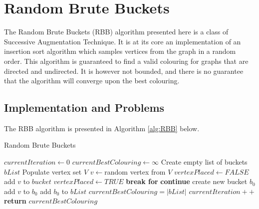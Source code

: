 \section{Random Brute Buckets}
The Random Brute Buckets (RBB) algorithm presented here is a class of Successive Augmentation Technique. It is at its core an implementation of an insertion sort algorithm which samples vertices from the graph in a random order. This algorithm is guaranteed to find a valid colouring for graphs that are directed and undirected. It is however not bounded, and there is no guarantee that the algorithm will converge upon the best colouring. 

\subsection{Implementation and Problems}
The RBB algorithm is presented in Algorithm \ref{alg:RBB} below.
\begin{algorithm}[H]
    \caption{Random Brute Buckets}
    \label{alg:RBB}
    \begin{algorithmic}[1] %
         			
			\State $currentIteration \gets 0$	
			\State $currentBestColouring \gets \infty$ \label{alg:RRB_initialColouring}
			\State Create empty list of buckets $bList$
            		\State Populate vertex set $V$
                		\State $v \gets $random vertex from $V$ 
					\State $vertexPlaced \gets FALSE$                		
                				\State add $v$ to $bucket$
                				\State $vertexPlaced \gets TRUE$
                				\State \textbf{break for}
                			\Else \textbf{ continue}
                			\EndIf
                		\EndFor
                		 
                			\State create new bucket $b_0$
                			\State add $v$ to $b_0$
                			\State add $b_0$ to $bList$
                		\EndIf
                	\EndWhile
            			\State $currentBestColouring = |bList|$
            		\EndIf
            		\State $currentIteration++$
            \EndWhile
            \State \textbf{return} $currentBestColouring$
        \EndProcedure
    \end{algorithmic}
\end{algorithm}

